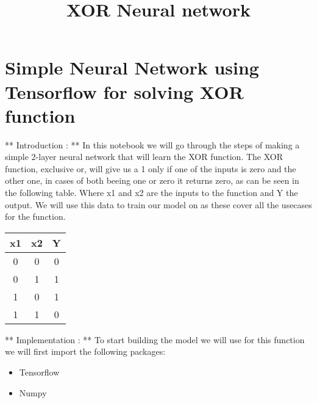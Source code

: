 \documentclass[11pt]{article}
\title{XOR Neural network}
\providecommand{\tightlist}{%
      \setlength{\itemsep}{0pt}\setlength{\parskip}{0pt}}
\begin{document}
    
    
    \maketitle
    
    

    
    \section{Simple Neural Network using Tensorflow for solving XOR
function}\label{simple-neural-network-using-tensorflow-for-solving-xor-function}

** Introduction : ** In this notebook we will go through the steps of
making a simple 2-layer neural network that will learn the XOR function.
The XOR function, exclusive or, will give us a 1 only if one of the
inputs is zero and the other one, in cases of both beeing one or zero it
returns zero, as can be seen in the following table. Where x1 and x2 are
the inputs to the function and Y the output. We will use this data to
train our model on as these cover all the usecases for the function.

\begin{longtable}[]{@{}ccc@{}}
\toprule
x1 & x2 & Y\tabularnewline
\midrule
\endhead
0 & 0 & 0\tabularnewline
0 & 1 & 1\tabularnewline
1 & 0 & 1\tabularnewline
1 & 1 & 0\tabularnewline
\bottomrule
\end{longtable}

** Implementation : ** To start building the model we will use for this
function we will first import the following packages:

\begin{itemize}
\tightlist
\item
  Tensorflow
\item
  Numpy
\end{itemize}
\end{document}
